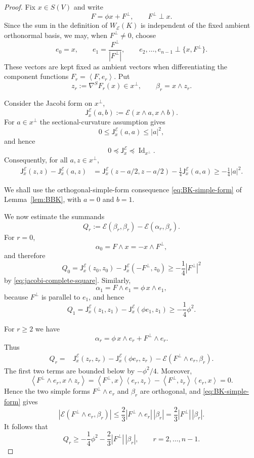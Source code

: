 \documentclass[reqno,11pt]{amsart}
\theoremstyle{definition}
\newcommand{\cE}{\mathcal E}
\newcommand{\Id}{\operatorname{Id}}
\newcommand{\inner}[2]{\left\langle #1,#2\right\rangle}
\begin{document}
\begin{proof}
Fix $x\in S(V)$ and write
$$
  F=\phi x+F^\perp,
  \qquad
  F^\perp\perp x.
$$
Since the sum in the definition of $W_{\cE}(K)$ is independent of the
fixed ambient orthonormal basis, we may, when $F^\perp\neq0$, choose
$$
  e_0=x,
  \qquad
  e_1=\frac{F^\perp}{|F^\perp|},
  \qquad
  e_2,\ldots,e_{n-1}\perp\{x,F^\perp\}.
$$
These vectors are kept fixed as ambient vectors when differentiating the
component functions $F_r=\inner{F}{e_r}$. Put
$$
  z_r:=\nabla^S F_r(x)\in x^\perp,
  \qquad
  \beta_r=x\wedge z_r.
$$

Consider the Jacobi form on $x^\perp$,
$$
  \mathsf J_x^{\cE}(a,b)
  :=\cE(x\wedge a,x\wedge b).
$$
For $a\in x^\perp$ the sectional-curvature assumption gives
$$
  0\leq\mathsf J_x^{\cE}(a,a)\leq |a|^2,
$$
and hence
$$
  0\preceq\mathsf J_x^{\cE}\preceq\Id_{x^\perp}.
$$
Consequently, for all $a,z\in x^\perp$,
\begin{align}
  \mathsf J_x^{\cE}(z,z)-\mathsf J_x^{\cE}(a,z)
  &=
  \mathsf J_x^{\cE}(z-a/2,z-a/2)
  -\frac14\mathsf J_x^{\cE}(a,a) \geq-\frac14|a|^2.
  \label{eq:jacobi-complete-square}
\end{align}

We shall use the orthogonal-simple-form consequence
\eqref{eq:BK-simple-form} of Lemma~\ref{lem:BBK}, with $a=0$ and $b=1$.

We now estimate the summands
$$
  Q_r:=\cE(\beta_r,\beta_r)-\cE(\alpha_r,\beta_r).
$$
For $r=0$,
$$
  \alpha_0=F\wedge x=-x\wedge F^\perp,
$$
and therefore
$$
  Q_0
  =\mathsf J_x^{\cE}(z_0,z_0)
   -\mathsf J_x^{\cE}(-F^\perp,z_0)
  \geq-\frac14|F^\perp|^2
$$
by \eqref{eq:jacobi-complete-square}. Similarly,
$$
  \alpha_1=F\wedge e_1=\phi\,x\wedge e_1,
$$
because $F^\perp$ is parallel to $e_1$, and hence
$$
  Q_1
  =\mathsf J_x^{\cE}(z_1,z_1)
   -\mathsf J_x^{\cE}(\phi e_1,z_1)
  \geq-\frac14\phi^2.
$$

For $r\geq2$ we have
$$
  \alpha_r=\phi\,x\wedge e_r+F^\perp\wedge e_r.
$$
Thus
\begin{align*}
  Q_r
  ={}&
  \mathsf J_x^{\cE}(z_r,z_r)
  -\mathsf J_x^{\cE}(\phi e_r,z_r)
  -\cE(F^\perp\wedge e_r,\beta_r).
\end{align*}
The first two terms are bounded below by $-\phi^2/4$. Moreover,
$$
  \inner{F^\perp\wedge e_r}{x\wedge z_r}
  =
  \inner{F^\perp}{x}\inner{e_r}{z_r}
  -\inner{F^\perp}{z_r}\inner{e_r}{x}
  =0.
$$
Hence the two simple forms $F^\perp\wedge e_r$ and $\beta_r$ are
orthogonal, and \eqref{eq:BK-simple-form} gives
$$
  |\cE(F^\perp\wedge e_r,\beta_r)|
  \leq\frac23|F^\perp\wedge e_r|\,|\beta_r|
  =\frac23|F^\perp|\,|\beta_r|.
$$
It follows that
$$
  Q_r\geq-\frac14\phi^2
  -\frac23|F^\perp|\,|\beta_r|,
  \qquad r=2,\ldots,n-1.
$$


\end{proof}
\end{document}
